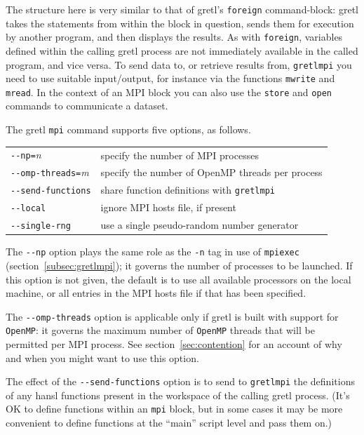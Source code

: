 \documentclass{article}
\begin{document}
The structure here is very similar to that of gretl's \texttt{foreign}
command-block: gretl takes the statements from within the block in
question, sends them for execution by another program, and then
displays the results. As with \texttt{foreign}, variables defined
within the calling gretl process are not immediately available in the
called program, and vice versa. To send data to, or retrieve results
from, \texttt{gretlmpi} you need to use suitable input/output, for
instance via the functions \texttt{mwrite} and \texttt{mread}. In the
context of an MPI block you can also use the \texttt{store} and
\texttt{open} commands to communicate a dataset.

The gretl \texttt{mpi} command supports five options, as follows.
\begin{center}
\begin{tabular}{ll}
\verb|--|\texttt{np=}\textsl{n} & specify the number of MPI processes\\
\verb|--|\texttt{omp-threads=}\textsl{m} & 
  specify the number of OpenMP threads per process \\
\verb|--|\texttt{send-functions} & 
  share function definitions with \texttt{gretlmpi} \\
\verb|--|\texttt{local} & ignore MPI hosts file, if present \\
\verb|--|\texttt{single-rng} & 
  use a single pseudo-random number generator
\end{tabular}
\end{center}

The \verb|--np| option plays the same role as the \verb|-n| tag in use
of \texttt{mpiexec} (section~\ref{subsec:gretlmpi}); it governs
the number of processes to be launched. If this option is not given,
the default is to use all available processors on the local machine,
or all entries in the MPI hosts file if that has been specified.

The \verb|--omp-threads| option is applicable only if gretl is built
with support for \texttt{OpenMP}: it governs the maximum number of
\texttt{OpenMP} threads that will be permitted per MPI process.  See
section~\ref{sec:contention} for an account of why and when you might
want to use this option.

The effect of the \verb|--send-functions| option is to send to
\texttt{gretlmpi} the definitions of any hansl functions present
in the workspace of the calling gretl process. (It's OK to define
functions within an \texttt{mpi} block, but in some cases it may be more
convenient to define functions at the ``main'' script level and pass
them on.)
\end{document}
